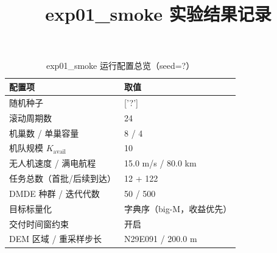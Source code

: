 \documentclass[a4paper,11pt]{article}
\begin{document}
\title{exp01\_smoke 实验结果记录}

\maketitle

\begin{table}[htbp]\centering
\caption{exp01\_smoke 运行配置总览（seed=?）}
\label{tab:exp01-config}
\begin{tabular}{ll}
\toprule
配置项 & 取值 \\
\midrule
随机种子 & ['?'] \\
滚动周期数 & 24 \\
机巢数 / 单巢容量 & 8 / 4 \\
机队规模 $K_{\mathrm{avail}}$ & 10 \\
无人机速度 / 满电航程 & 15.0 m/s / 80.0 km \\
任务总数（首批/后续到达） & 12 + 122 \\
DMDE 种群 / 迭代代数 & 50 / 500 \\
目标标量化 & 字典序（big-M，收益优先） \\
交付时间窗约束 & 开启 \\
DEM 区域 / 重采样步长 & N29E091 / 200.0 m \\
\bottomrule
\end{tabular}
\end{table}
\end{document}
